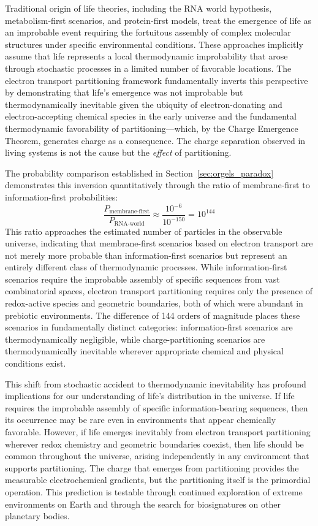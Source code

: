 \documentclass[12pt,a4paper]{article}
\begin{document}
Traditional origin of life theories, including the RNA world hypothesis, metabolism-first scenarios, and protein-first models, treat the emergence of life as an improbable event requiring the fortuitous assembly of complex molecular structures under specific environmental conditions. These approaches implicitly assume that life represents a local thermodynamic improbability that arose through stochastic processes in a limited number of favorable locations. The electron transport partitioning framework fundamentally inverts this perspective by demonstrating that life's emergence was not improbable but thermodynamically inevitable given the ubiquity of electron-donating and electron-accepting chemical species in the early universe and the fundamental thermodynamic favorability of partitioning---which, by the Charge Emergence Theorem, generates charge as a consequence. The charge separation observed in living systems is not the cause but the \emph{effect} of partitioning.

The probability comparison established in Section~\ref{sec:orgels_paradox} demonstrates this inversion quantitatively through the ratio of membrane-first to information-first probabilities:
\begin{equation}
    \frac{P_{\text{membrane-first}}}{P_{\text{RNA-world}}} \approx \frac{10^{-6}}{10^{-150}} = 10^{144}
\end{equation}
This ratio approaches the estimated number of particles in the observable universe, indicating that membrane-first scenarios based on electron transport are not merely more probable than information-first scenarios but represent an entirely different class of thermodynamic processes. While information-first scenarios require the improbable assembly of specific sequences from vast combinatorial spaces, electron transport partitioning requires only the presence of redox-active species and geometric boundaries, both of which were abundant in prebiotic environments. The difference of 144 orders of magnitude places these scenarios in fundamentally distinct categories: information-first scenarios are thermodynamically negligible, while charge-partitioning scenarios are thermodynamically inevitable wherever appropriate chemical and physical conditions exist.

This shift from stochastic accident to thermodynamic inevitability has profound implications for our understanding of life's distribution in the universe. If life requires the improbable assembly of specific information-bearing sequences, then its occurrence may be rare even in environments that appear chemically favorable. However, if life emerges inevitably from electron transport partitioning wherever redox chemistry and geometric boundaries coexist, then life should be common throughout the universe, arising independently in any environment that supports partitioning. The charge that emerges from partitioning provides the measurable electrochemical gradients, but the partitioning itself is the primordial operation. This prediction is testable through continued exploration of extreme environments on Earth and through the search for biosignatures on other planetary bodies.
\end{document}

